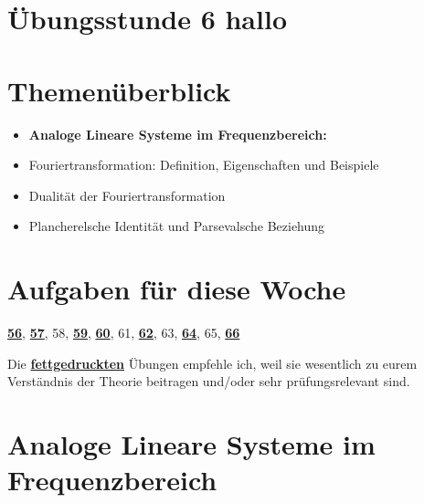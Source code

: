 \documentclass[11pt]{article}
\begin{document}
\thispagestyle{firstpage}

\setlength{\headheight}{1 \baselineskip}  %
\setlength{\parindent}{0pt}  %
\setlength{\parskip}{\baselineskip}  %

\vspace*{-5px}
\section*{Übungsstunde 6 hallo}

\section*{Themenüberblick}
\begin{itemize} 
    \item \textbf{Analoge Lineare Systeme im Frequenzbereich:}
    \item[] Fouriertransformation: Definition, Eigenschaften und Beispiele
    \item[] Dualität der Fouriertransformation
    \item[] Plancherelsche Identität und Parsevalsche Beziehung
\end{itemize}

\section*{Aufgaben für diese Woche}
\vspace{-0.5cm}

\underline{\textbf{56}}, \underline{\textbf{57}}, 58, \underline{\textbf{59}}, \underline{\textbf{60}}, 61, \underline{\textbf{62}}, 63, \underline{\textbf{64}}, 65, \underline{\textbf{66}}\\
\vspace{-0.5cm}

Die \underline{\textbf{fettgedruckten}} Übungen empfehle ich, weil sie wesentlich zu eurem Verständnis der Theorie beitragen und/oder sehr prüfungsrelevant sind.

\vfill \null
\pagebreak

\section*{Analoge Lineare Systeme im Frequenzbereich}
\vspace*{-0.5cm}
\end{document}
